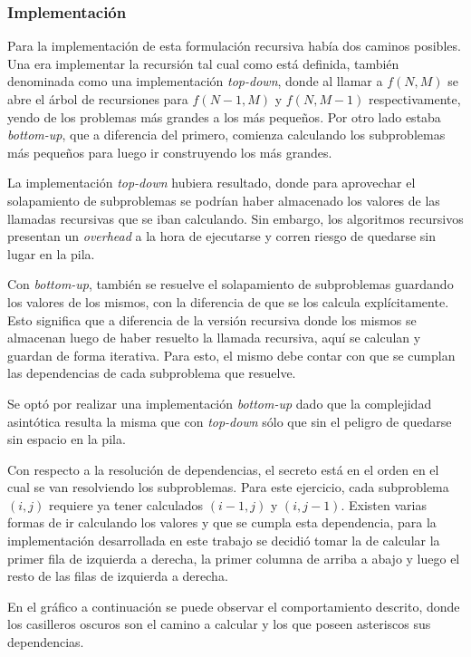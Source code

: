 	\subsubsection{Implementación}

	Para la implementación de esta formulación recursiva había dos caminos
	posibles. Una era implementar la recursión tal cual como está definida,
	también denominada como una implementación \emph{top-down}, donde al llamar a $f(N,
	M)$ se abre el árbol de recursiones para $f(N - 1, M)$ y $f(N, M - 1)$
	respectivamente, yendo de los problemas más grandes a los más pequeños. Por
	otro lado estaba \emph{bottom-up}, que a diferencia del primero, comienza
	calculando los subproblemas más pequeños para luego ir construyendo los más
	grandes.

	La implementación \emph{top-down} hubiera resultado, donde para aprovechar
	el solapamiento de subproblemas se podrían haber almacenado los valores de
	las llamadas recursivas que se iban calculando. Sin embargo, los algoritmos
	recursivos presentan un \emph{overhead} a la hora de ejecutarse y corren
	riesgo de quedarse sin lugar en la pila.

	Con \emph{bottom-up}, también se resuelve el solapamiento de subproblemas
	guardando los valores de los mismos, con la diferencia de que se los calcula
	explícitamente. Esto significa que a diferencia de la versión recursiva
	donde los mismos se almacenan luego de haber resuelto la llamada recursiva,
	aquí se calculan y guardan de forma iterativa. Para esto, el mismo debe
	contar con que se cumplan las dependencias de cada subproblema que resuelve.

	Se optó por realizar una implementación \emph{bottom-up} dado que la
	complejidad asintótica resulta la misma que con \emph{top-down} sólo que sin el peligro
	de quedarse sin espacio en la pila.

	Con respecto a la resolución de dependencias, el secreto está en el orden en
	el cual se van resolviendo los subproblemas. Para este ejercicio, cada
	subproblema $(i, j)$ requiere ya tener calculados $(i - 1, j)$ y $(i, j -
	1)$. Existen varias formas de ir calculando los valores y que se cumpla esta
	dependencia, para la implementación desarrollada en este trabajo se decidió
	tomar la de calcular la primer fila de izquierda a derecha, la primer
	columna de arriba a abajo y luego el resto de las filas de izquierda a
	derecha.

	En el gráfico a continuación se puede observar el comportamiento descrito,
	donde los casilleros oscuros son el camino a calcular y los que poseen
	asteriscos sus dependencias.


